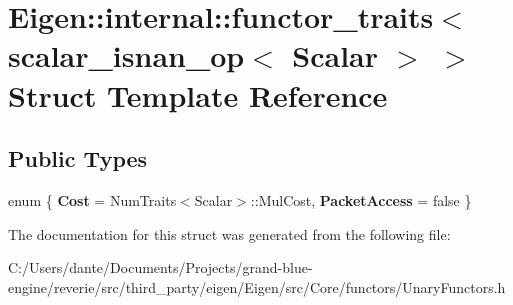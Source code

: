 \hypertarget{struct_eigen_1_1internal_1_1functor__traits_3_01scalar__isnan__op_3_01_scalar_01_4_01_4}{}\section{Eigen\+::internal\+::functor\+\_\+traits$<$ scalar\+\_\+isnan\+\_\+op$<$ Scalar $>$ $>$ Struct Template Reference}
\label{struct_eigen_1_1internal_1_1functor__traits_3_01scalar__isnan__op_3_01_scalar_01_4_01_4}
\subsection*{Public Types}
\begin{DoxyCompactItemize}
\item 
\mbox{\label{struct_eigen_1_1internal_1_1functor__traits_3_01scalar__isnan__op_3_01_scalar_01_4_01_4_acdab5a757387f151462c0f33e2cab164}} 
enum \{ {\bfseries Cost} = Num\+Traits$<$Scalar$>$\+::Mul\+Cost, 
{\bfseries Packet\+Access} = false
 \}
\end{DoxyCompactItemize}


The documentation for this struct was generated from the following file\+:\begin{DoxyCompactItemize}
\item 
C\+:/\+Users/dante/\+Documents/\+Projects/grand-\/blue-\/engine/reverie/src/third\+\_\+party/eigen/\+Eigen/src/\+Core/functors/Unary\+Functors.\+h\end{DoxyCompactItemize}
